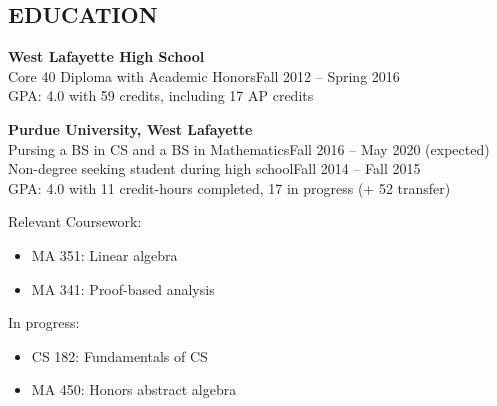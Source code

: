 \documentclass[line,margin]{res}
\begin{document}
\begin{resume}



  \section{EDUCATION}
  {\bf\rmfamily West Lafayette High School}\\
  Core 40 Diploma with Academic Honors\hfill Fall 2012 -- Spring 2016\\
  GPA: 4.0 with 59 credits, including 17 AP credits%

  {\bf\rmfamily Purdue University, West Lafayette}\\
  Pursing a BS in CS and a BS in Mathematics\hfill Fall 2016 -- May 2020 (expected)\\
  Non-degree seeking student during high school\hfill Fall 2014 -- Fall 2015\\
  GPA: 4.0 with 11 credit-hours completed, 17 in progress (+ 52 transfer)
  \begin{multicols}{2}
  Relevant Coursework:
  \begin{itemize} \itemsep -2pt
  \item MA 351: Linear algebra
  \item MA 341: Proof-based analysis
  \end{itemize}
  In progress:
  \begin{itemize} \itemsep -2pt
  \item CS 182: Fundamentals of CS
  \item MA 450: Honors abstract algebra
  \end{itemize}
  \end{multicols}




\end{resume}
\end{document}
